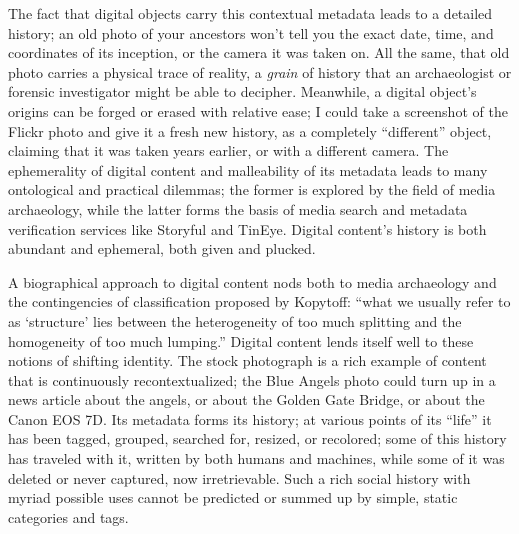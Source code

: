 The fact that digital objects carry this contextual metadata leads to a detailed history; an old photo of your ancestors won't tell you the exact date, time, and coordinates of its inception, or the camera it was taken on. All the same, that old photo carries a physical trace of reality, a \emph{grain} of history that an archaeologist or forensic investigator might be able to decipher. Meanwhile, a digital object's origins can be forged or erased with relative ease; I could take a screenshot of the Flickr photo and give it a fresh new history, as a completely ``different'' object, claiming that it was taken years earlier, or with a different camera. The ephemerality of digital content and malleability of its metadata leads to many ontological and practical dilemmas; the former is explored by the field of media archaeology, while the latter forms the basis of media search and metadata verification services like Storyful and TinEye. Digital content's history is both abundant and ephemeral, both given and plucked.

A biographical approach to digital content nods both to media archaeology and the contingencies of classification proposed by Kopytoff: ``what we usually refer to as `structure' lies between the heterogeneity of too much splitting and the homogeneity of too much lumping.''\autocite[70]{appadurai_cultural_1986} Digital content lends itself well to these notions of shifting identity. The stock photograph is a rich example of content that is continuously recontextualized; the Blue Angels photo could turn up in a news article about the angels, or about the Golden Gate Bridge, or about the Canon EOS 7D. Its metadata forms its history; at various points of its ``life'' it has been tagged, grouped, searched for, resized, or recolored; some of this history has traveled with it, written by both humans and machines, while some of it was deleted or never captured, now irretrievable. Such a rich social history with myriad possible uses cannot be predicted or summed up by simple, static categories and tags.

